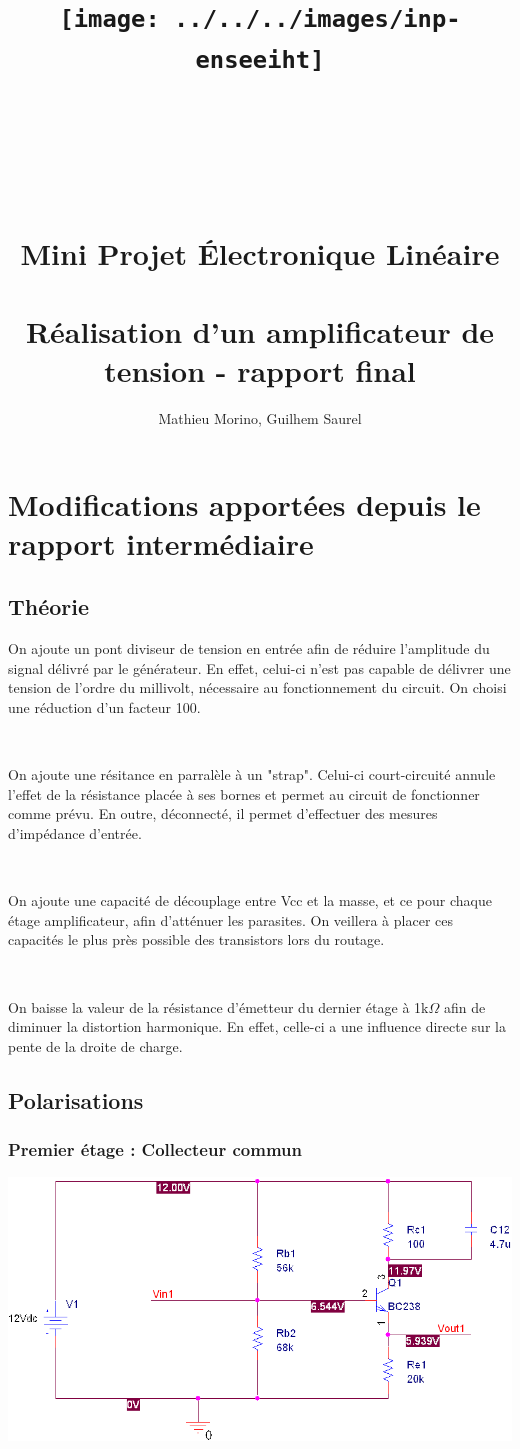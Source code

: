 \documentclass[11pt;a4paper]{report}
\title{\texttt{[image: ../../../images/inp-enseeiht]} \\ ~ \\ ~ \\ ~ \\ ~ \\ Mini Projet Électronique Linéaire \\ ~ \\ \large{Réalisation d'un amplificateur de tension - rapport final}}
\author{Mathieu Morino, Guilhem Saurel}
\date{\oldstylenums{\today}}
\begin{document}
 \begin{titlepage}
  \maketitle
 \end{titlepage}

 \tableofcontents
 
 \chapter{Modifications apportées depuis le rapport intermédiaire}
  \section{Théorie}
    On ajoute un pont diviseur de tension en entrée afin de réduire l'amplitude du signal délivré par le générateur. En effet, celui-ci n'est pas capable de délivrer une tension de l'ordre du millivolt, nécessaire au fonctionnement du circuit. On choisi une réduction d'un facteur 100.

~

    On ajoute une résitance en parralèle à un "strap". Celui-ci court-circuité annule l'effet de la résistance placée à ses bornes et permet au circuit de fonctionner comme prévu. En outre, déconnecté, il permet d'effectuer des mesures d'impédance d'entrée.

~

    On ajoute une capacité de découplage entre Vcc et la masse, et ce pour chaque étage amplificateur, afin d'atténuer les parasites. On veillera à placer ces capacités le plus près possible des transistors lors du routage.

~

    On baisse la valeur de la résistance d'émetteur du dernier étage à 1k$\Omega$ afin de diminuer la distortion harmonique. En effet, celle-ci a une influence directe sur la pente de la droite de charge. 


  \section{Polarisations}
   \subsection{Premier étage : Collecteur commun}
    \begin{center}
     \includegraphics[width=17cm]{images/etage1.PNG}
    \end{center}
\end{document}
